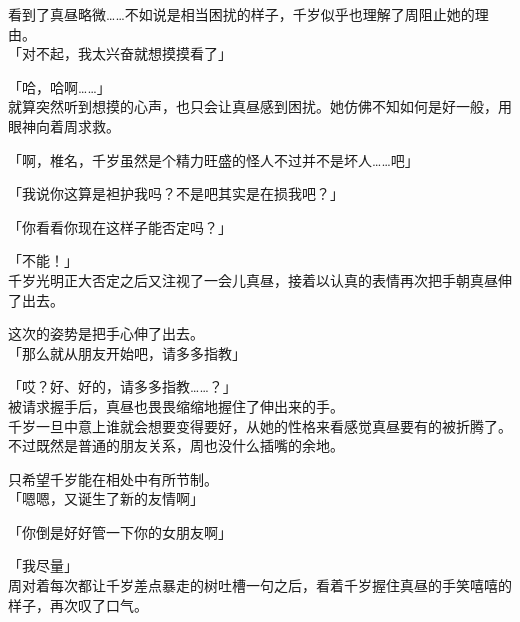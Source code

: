 看到了真昼略微……不如说是相当困扰的样子，千岁似乎也理解了周阻止她的理由。\\

「对不起，我太兴奋就想摸摸看了」

「哈，哈啊……」\\

就算突然听到想摸的心声，也只会让真昼感到困扰。她仿佛不知如何是好一般，用眼神向着周求救。

「啊，椎名，千岁虽然是个精力旺盛的怪人不过并不是坏人……吧」

「我说你这算是袒护我吗？不是吧其实是在损我吧？」

「你看看你现在这样子能否定吗？」

「不能！」\\

千岁光明正大否定之后又注视了一会儿真昼，接着以认真的表情再次把手朝真昼伸了出去。

这次的姿势是把手心伸了出去。\\

「那么就从朋友开始吧，请多多指教」

「哎？好、好的，请多多指教……？」\\

被请求握手后，真昼也畏畏缩缩地握住了伸出来的手。\\

千岁一旦中意上谁就会想要变得要好，从她的性格来看感觉真昼要有的被折腾了。不过既然是普通的朋友关系，周也没什么插嘴的余地。

只希望千岁能在相处中有所节制。\\

「嗯嗯，又诞生了新的友情啊」

「你倒是好好管一下你的女朋友啊」

「我尽量」\\

周对着每次都让千岁差点暴走的树吐槽一句之后，看着千岁握住真昼的手笑嘻嘻的样子，再次叹了口气。\\

